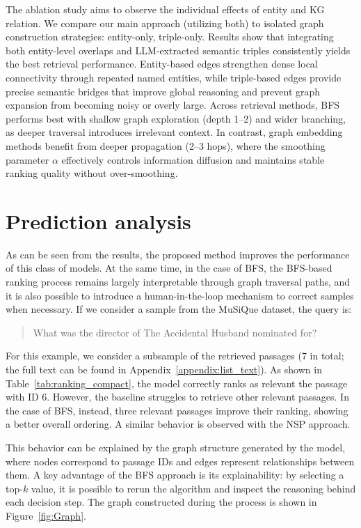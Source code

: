 \documentclass[11pt]{article}
\begin{document}
The ablation study aims to observe the individual effects of entity and KG relation. We compare our main approach (utilizing both) to isolated graph construction strategies: entity-only, triple-only. 
Results show that integrating both entity-level overlaps and LLM-extracted semantic triples consistently yields the best retrieval performance. Entity-based edges strengthen dense local connectivity through repeated named entities, while triple-based edges provide precise semantic bridges that improve global reasoning and prevent graph expansion from becoming noisy or overly large.
Across retrieval methods, BFS performs best with shallow graph exploration (depth 1--2) and wider branching, as deeper traversal introduces irrelevant context. In contrast, graph embedding methods benefit from deeper propagation (2--3 hops), where the smoothing parameter $\alpha$ effectively controls information diffusion and maintains stable ranking quality without over-smoothing.


\section{Prediction analysis}

As can be seen from the results, the proposed method improves the performance of this class of models. At the same time, in the case of BFS, the BFS-based ranking process remains largely interpretable through graph traversal paths, and it is also possible to introduce a human-in-the-loop mechanism to correct samples when necessary. If we consider a sample from the MuSiQue dataset, the query is:

\begin{quote}
What was the director of The Accidental Husband nominated for?
\end{quote}

For this example, we consider a subsample of the retrieved passages (7 in total; the full text can be found in Appendix~\ref{appendix:list_text}). As shown in Table~\ref{tab:ranking_compact}, the model correctly ranks as relevant the passage with ID 6. However, the baseline struggles to retrieve other relevant passages. In the case of BFS, instead, three relevant passages improve their ranking, showing a better overall ordering. A similar behavior is observed with the NSP approach.

This behavior can be explained by the graph structure generated by the model, where nodes correspond to passage IDs and edges represent relationships between them. A key advantage of the BFS approach is its explainability: by selecting a top-$k$ value, it is possible to rerun the algorithm and inspect the reasoning behind each decision step. The graph constructed during the process is shown in Figure~\ref{fig:Graph}.
\end{document}
